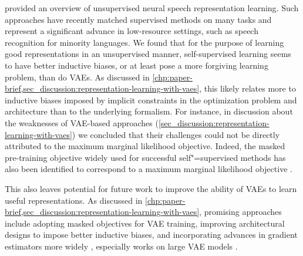 \vspace{1em}
\textbf{} provided an overview of unsupervised neural speech representation learning. Such approaches have recently matched supervised methods on many tasks and represent a significant advance in low-resource settings, such as speech recognition for minority languages. 
We found that for the purpose of learning good representations in an unsupervised manner, self-supervised learning seems to have better inductive biases, or at least pose a more forgiving learning problem, than do VAEs. As discussed in \cref{chp:paper-brief,sec_discussion:representation-learning-with-vaes}, this likely relates more to inductive biases imposed by implicit constraints in the optimization problem and architecture than to the underlying formalism. 
For instance, in discussion about the weaknesses of VAE-based approaches (\cref{sec_discussion:representation-learning-with-vaes}) we concluded that their challenges could not be directly attributed to the maximum marginal likelihood objective. Indeed, the masked pre-training objective widely used for successful self"=supervised methods has also been identified to correspond to a maximum marginal likelihood objective \parencite{moreno-munoz_masked_2023}. 

This also leaves potential for future work to improve the ability of VAEs to learn useful representations. As discussed in \cref{chp:paper-brief,sec_discussion:representation-learning-with-vaes}, promising approaches include adopting masked objectives for VAE training, improving architectural designs to impose better inductive biases, and incorporating advances in gradient estimators more widely \parencite{rainforth_tighter_2019,roeder_sticking_2017,tucker_doubly_2019,bauer_generalized_2021}, especially works on large VAE models \parencite{maaloe_biva_2019,vahdat_nvae_2020,child_very_2021}. 



